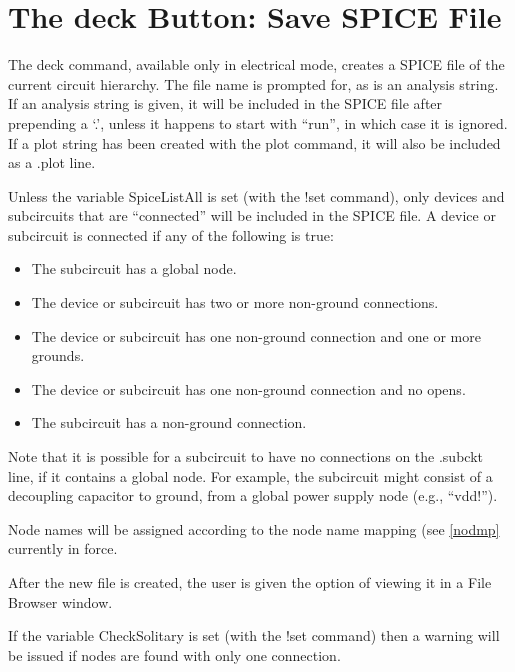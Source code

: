 \section{The {\cb deck} Button:  Save SPICE File}

The {\cb deck} command, available only in electrical mode, creates a
SPICE file of the current circuit hierarchy.  The file name is
prompted for, as is an analysis string.  If an analysis string is
given, it will be included in the SPICE file after prepending a `.',
unless it happens to start with ``run'', in which case it is ignored. 
If a plot string has been created with the {\cb plot} command, it will
also be included as a {\vt .plot} line. 

Unless the variable {\et SpiceListAll} is set (with the {\cb !set}
command), only devices and subcircuits that are ``connected'' will be
included in the SPICE file.  A device or subcircuit is connected if
any of the following is true:
\begin{itemize}
\item{The subcircuit has a global node.}
\item{The device or subcircuit has two or more non-ground
connections.}
\item{The device or subcircuit has one non-ground connection and one
or more grounds.}
\item{The device or subcircuit has one non-ground connection and no
opens.}
\item{The subcircuit has a non-ground connection.}
\end{itemize}

Note that it is possible for a subcircuit to have no connections on
the {\vt .subckt} line, if it contains a global node.  For example,
the subcircuit might consist of a decoupling capacitor to ground, from
a global power supply node (e.g., ``{\vt vdd!}'').

Node names will be assigned according to the node name mapping (see
 \ref{nodmp} currently in force.

After the new file is created, the user is given the option of viewing
it in a {\cb File Browser} window.

If the variable {\et CheckSolitary} is set (with the {\cb !set}
command) then a warning will be issued if nodes are found with only
one connection.


